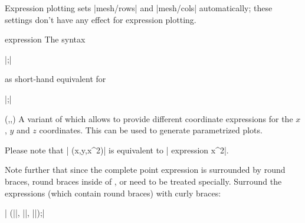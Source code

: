 {\begin{addplot3operation}[]{}{}
\pgfplotsexpensiveexample
\begin{codeexample}[]
\end{codeexample}

\pgfplotsexpensiveexample
\begin{codeexample}[]
\end{codeexample}

	Expression plotting sets |mesh/rows| and |mesh/cols| automatically; these settings don't have any effect for expression plotting.
\end{addplot3operation}

\begin{addplot3operation}[]{expression}{}
	The syntax

	 |;|

	as short-hand equivalent for

	 |;|
\end{addplot3operation}

\begin{addplot3operation}[]{(,,)}{}
	A variant of  which allows to provide different coordinate expressions for the $x$, $y$ and $z$ coordinates. This can be used to generate parametrized plots.

	Please note that | (x,y,x^2)| is equivalent to | expression {x^2}|.

	Note further that since the complete point expression is surrounded by round braces, round braces inside of ,  or  need to be treated specially. Surround the expressions (which contain round braces) with curly braces:

	| (||, ||, ||);|
\end{addplot3operation}

}
